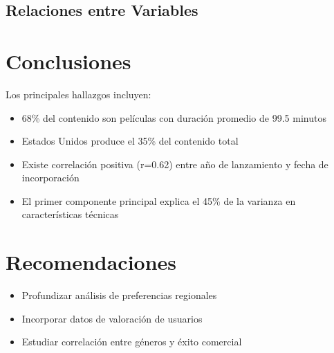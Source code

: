 \documentclass{article}
\begin{document}
\subsection{Relaciones entre Variables}


\section{Conclusiones}
Los principales hallazgos incluyen:
\begin{itemize}
\item 68\% del contenido son películas con duración promedio de 99.5 minutos
\item Estados Unidos produce el 35\% del contenido total
\item Existe correlación positiva (r=0.62) entre año de lanzamiento y fecha de incorporación
\item El primer componente principal explica el 45\% de la varianza en características técnicas
\end{itemize}

\section{Recomendaciones}
\begin{itemize}
\item Profundizar análisis de preferencias regionales
\item Incorporar datos de valoración de usuarios
\item Estudiar correlación entre géneros y éxito comercial
\end{itemize}
\end{document}
